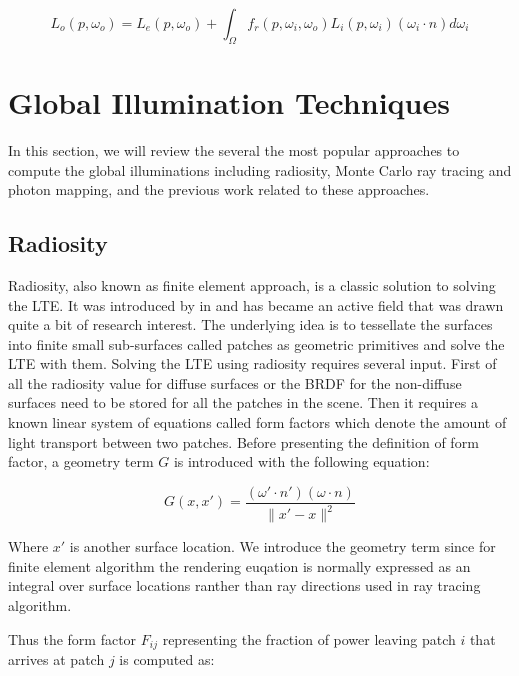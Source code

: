 \begin{equation}
L_{o}(p, \omega_{o}) = L_{e}(p, \omega_{o}) + \int_{\Omega}f_{r}(p, \omega_{i}, \omega_{o})L_{i}(p, \omega_{i})(\omega_{i} \cdot n)d\omega_{i}
\label{eq:lte}
\end{equation}


\section{Global Illumination Techniques} 
In this section, we will review the several the most popular approaches to compute the global illuminations including radiosity, Monte Carlo ray tracing and photon mapping, and the previous work related to these approaches.

\subsection{Radiosity}

Radiosity, also known as finite element approach, is a classic solution to solving the LTE. It was introduced by  \citeauthor{Goral:1984:MIL:964965.808601} in \citep{Goral:1984:MIL:964965.808601} and has became an active field that was drawn quite a bit of research interest. The underlying idea is to tessellate the surfaces into finite small sub-surfaces called patches as geometric primitives and solve the LTE with them. Solving the LTE using radiosity requires several input. First of all the radiosity value for diffuse surfaces or the BRDF for the non-diffuse surfaces need to be stored for all the patches in the scene. Then it requires a known linear system of equations called form factors which denote the amount of light transport between two patches. Before presenting the definition of form factor, a geometry term \(G\) is introduced with the following equation: 

\begin{equation}
G(x, x') = \frac{(\omega' \cdot n')(\omega \cdot n)}{\|x' - x\|^2}
\label{eq:geometry_term}
\end{equation} 

Where \(x'\) is another surface location. We introduce the geometry term since for finite element algorithm the rendering euqation is normally expressed as an integral over surface locations ranther than ray directions used in ray tracing algorithm. 

Thus the form factor \(F_{ij}\) representing the fraction of power leaving patch \(i\) that arrives at patch \(j\) is computed as:

